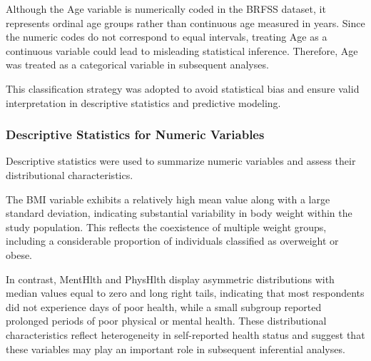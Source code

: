 Although the Age variable is numerically coded in the BRFSS dataset, it represents ordinal age groups rather than continuous age measured in years. Since the numeric codes do not correspond to equal intervals, treating Age as a continuous variable could lead to misleading statistical inference. Therefore, Age was treated as a categorical variable in subsequent analyses.

This classification strategy was adopted to avoid statistical bias and ensure valid interpretation in descriptive statistics and predictive modeling.

\subsubsection{Descriptive Statistics for Numeric Variables}

Descriptive statistics were used to summarize numeric variables and assess their distributional characteristics.

\begin{table}[H]
\centering
\caption{Descriptive statistics for numeric variables}
\label{tab:desc_numeric}

\end{table}

The BMI variable exhibits a relatively high mean value along with a large standard deviation, indicating substantial variability in body weight within the study population. This reflects the coexistence of multiple weight groups, including a considerable proportion of individuals classified as overweight or obese.

In contrast, MentHlth and PhysHlth display asymmetric distributions with median values equal to zero and long right tails, indicating that most respondents did not experience days of poor health, while a small subgroup reported prolonged periods of poor physical or mental health. These distributional characteristics reflect heterogeneity in self-reported health status and suggest that these variables may play an important role in subsequent inferential analyses.

